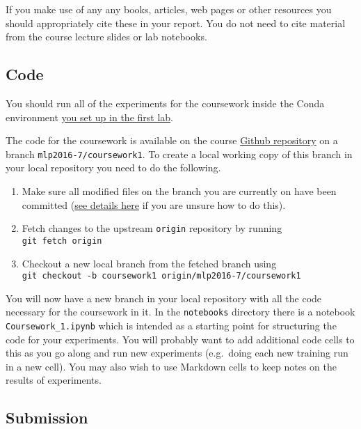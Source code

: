 \documentclass[11pt,]{article}
\begin{document}
If you make use of any any books, articles, web pages or other resources
you should appropriately cite these in your report. You do not need to
cite material from the course lecture slides or lab notebooks.

\subsection{Code}\label{code}

You should run all of the experiments for the coursework inside the
Conda environment
\href{https://github.com/CSTR-Edinburgh/mlpractical/blob/mlp2016-7/master/environment-set-up.md}{you
set up in the first lab}.

The code for the coursework is available on the course
\href{https://github.com/CSTR-Edinburgh/mlpractical/}{Github repository}
on a branch \texttt{mlp2016-7/coursework1}. To create a local working
copy of this branch in your local repository you need to do the
following.

\begin{enumerate}
\def\labelenumi{\arabic{enumi}.}
\itemsep1pt\parskip0pt
\item
  Make sure all modified files on the branch you are currently on have
  been committed
  (\href{https://github.com/CSTR-Edinburgh/mlpractical/blob/mlp2016-7/master/getting-started-in-a-lab.md}{see
  details here} if you are unsure how to do this).
\item
  Fetch changes to the upstream \texttt{origin} repository by running\\
  \texttt{git fetch origin}
\item
  Checkout a new local branch from the fetched branch using\\
  \texttt{git checkout -b coursework1 origin/mlp2016-7/coursework1}
\end{enumerate}

You will now have a new branch in your local repository with all the
code necessary for the coursework in it. In the \texttt{notebooks}
directory there is a notebook \texttt{Coursework\_1.ipynb} which is
intended as a starting point for structuring the code for your
experiments. You will probably want to add additional code cells to this
as you go along and run new experiments (e.g.~doing each new training
run in a new cell). You may also wish to use Markdown cells to keep
notes on the results of experiments.

\subsection{Submission}\label{submission}
\end{document}

